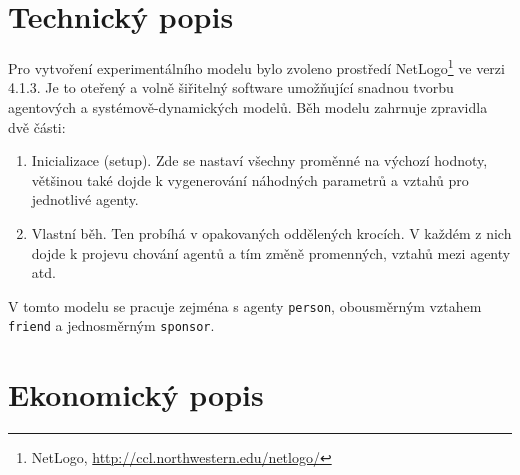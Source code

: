 \documentclass[a4wide,12pt]{report}
\begin{document}
\section{Technický popis}
Pro vytvoření experimentálního modelu bylo zvoleno prostředí NetLogo\footnote{NetLogo, \url{http://ccl.northwestern.edu/netlogo/}} ve verzi 4.1.3. Je to oteřený a volně šiřitelný software umožňující snadnou tvorbu agentových a systémově-dynamických modelů. Běh modelu zahrnuje zpravidla dvě části:
\begin{enumerate}
\item Inicializace (setup). Zde se nastaví všechny proměnné na výchozí hodnoty, většinou také dojde k vygenerování náhodných parametrů a vztahů pro jednotlivé agenty.
\item Vlastní běh. Ten probíhá v opakovaných oddělených krocích. V každém z nich dojde k projevu chování agentů a tím změně promenných, vztahů mezi agenty atd.
\end{enumerate}
V tomto modelu se pracuje zejména s agenty \texttt{person}, obousměrným vztahem \texttt{friend} a jednosměrným \texttt{sponsor}.
\section{Ekonomický popis}
\end{document}
